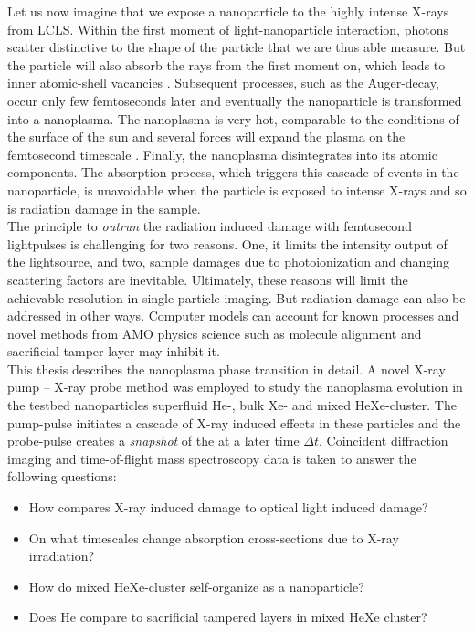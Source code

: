 %
Let us now imagine that we expose a nanoparticle to the highly intense X-rays from LCLS. Within the first moment of light-nanoparticle interaction, photons scatter distinctive to the shape of the particle that we are thus able measure. But the particle will also absorb the rays from the first moment on, which leads to inner atomic-shell vacancies \citep{Young-2010-Nature}. Subsequent processes, such as the Auger-decay, occur only few femtoseconds later and eventually the nanoparticle is transformed into a nanoplasma. The nanoplasma is very hot, comparable to the conditions of the surface of the sun and several forces will expand the plasma on the femtosecond timescale \citep{Gorkhover-2016-NatPho}. Finally, the nanoplasma disintegrates into its atomic components. The absorption process, which triggers this cascade of events in the nanoparticle, is unavoidable when the particle is exposed to intense X-rays and so is radiation damage in the sample.\\[1\baselineskip]
%
The principle to \textit{outrun} the radiation induced damage with femtosecond lightpulses is challenging for two reasons. One, it limits the intensity output of the lightsource, and two, sample damages due to photoionization and changing scattering factors are inevitable. Ultimately, these reasons will limit the achievable resolution in single particle imaging. But radiation damage can also be addressed in other ways. Computer models can account for known processes \citep{Quiney-2010-NatPhys} and novel methods from AMO physics science such as molecule alignment \citep{Kupper-2014-PRL} and sacrificial tamper layer \citep{Hau-Riege-2004-PRE,Hau-Riege-2010-PRL} may inhibit it.\\[1\baselineskip]
%
This thesis describes the nanoplasma phase transition in detail. A novel X-ray pump -- X-ray probe method was employed to study the nanoplasma evolution in the testbed nanoparticles superfluid He-, bulk Xe- and mixed HeXe-cluster. The pump-pulse initiates a cascade of X-ray induced effects in these particles and the probe-pulse creates a \textit{snapshot} of the at a later time $\Delta t$. Coincident diffraction imaging and time-of-flight mass spectroscopy data is taken to answer the following questions:
\begin{itemize}
	\item How compares X-ray induced damage to optical light induced damage?
	\item On what timescales change absorption cross-sections due to X-ray irradiation?
	\item How do mixed HeXe-cluster self-organize as a nanoparticle?
	\item Does He compare to sacrificial tampered layers in mixed HeXe cluster?
\end{itemize}
